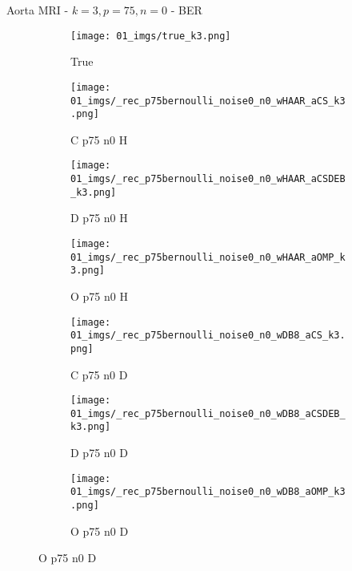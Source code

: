 \begin{frame}{Aorta MRI - $k=3,p=75,n=0$ - BER}{}
\begin{figure}
\begin{subfigure}{0.13\textwidth}
\texttt{[image: 01\_imgs/true\_k3.png]}
\caption*{\tiny True}
\end{subfigure}
\begin{subfigure}{0.13\textwidth}
\texttt{[image: 01\_imgs/\_rec\_p75bernoulli\_noise0\_n0\_wHAAR\_aCS\_k3.png]}
\caption*{\tiny C p75 n0 H}
\end{subfigure}
\begin{subfigure}{0.13\textwidth}
\texttt{[image: 01\_imgs/\_rec\_p75bernoulli\_noise0\_n0\_wHAAR\_aCSDEB\_k3.png]}
\caption*{\tiny D p75 n0 H}
\end{subfigure}
\begin{subfigure}{0.13\textwidth}
\texttt{[image: 01\_imgs/\_rec\_p75bernoulli\_noise0\_n0\_wHAAR\_aOMP\_k3.png]}
\caption*{\tiny O p75 n0 H}
\end{subfigure}
\begin{subfigure}{0.13\textwidth}
\texttt{[image: 01\_imgs/\_rec\_p75bernoulli\_noise0\_n0\_wDB8\_aCS\_k3.png]}
\caption*{\tiny C p75 n0 D}
\end{subfigure}
\begin{subfigure}{0.13\textwidth}
\texttt{[image: 01\_imgs/\_rec\_p75bernoulli\_noise0\_n0\_wDB8\_aCSDEB\_k3.png]}
\caption*{\tiny D p75 n0 D}
\end{subfigure}
\begin{subfigure}{0.13\textwidth}
\texttt{[image: 01\_imgs/\_rec\_p75bernoulli\_noise0\_n0\_wDB8\_aOMP\_k3.png]}
\caption*{\tiny O p75 n0 D}
\end{subfigure}

\vspace{5pt}


\end{figure}
\end{frame}
